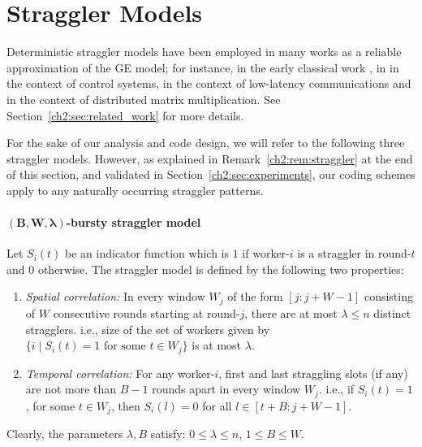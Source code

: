 \section{Straggler Models}\label{ch2:sec:straggler_model}

Deterministic straggler models have been employed in many works as a reliable approximation of the GE model; for instance, in the early classical work \cite{ForneyBursty}, in \cite{SaberiFN19} in the context of control systems,  \cite{martsun} in the context of low-latency communications and  \cite{seqmatmult} in the context of distributed matrix multiplication. See Section~\ref{ch2:sec:related_work} for more details.

For the sake of our analysis and code design, we will refer to the following three straggler models.  However, as explained in Remark~\ref{ch2:rem:straggler} at the end of this section, and validated in Section~\ref{ch2:sec:experiments}, our coding schemes apply to any naturally occurring straggler patterns. 

\paragraph{$\boldsymbol{(B, W, \lambda)}$-bursty straggler model} Let $S_i(t)$ be an indicator function which is $1$ if worker-$i$ is a straggler in round-$t$ and $0$ otherwise. The straggler model is defined by the following two properties:

\begin{enumerate}

\item \textit{Spatial correlation:} In every window $W_j$ of the form $[j:j+W-1]$ consisting of $W$ consecutive rounds starting at round-$j$, there are at most $\lambda\leq n$ distinct stragglers. i.e., size of the set of workers given by $\{i\mid S_i(t)=1\text{ for some $t\in W_j$}\}$ is at most $\lambda$. 

\item \textit{Temporal correlation:} For any worker-$i$,  first and last straggling slots (if any) are not more than $B-1$ rounds apart in every window $W_j$. i.e., if $S_i(t)=1$, for some $t\in W_j$, then $S_i(l)=0$ for all $l\in[t+B:j+W-1]$.

\end{enumerate}

Clearly, the parameters $\lambda,B$ satisfy: $0\leq \lambda\leq n$, $1\leq B\leq W$. 


